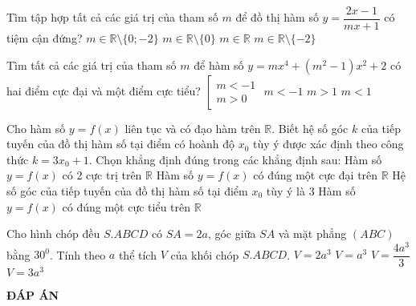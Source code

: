 \begin{ex}%
Tìm tập hợp tất cả các giá trị của tham số $m$ để đồ thị hàm số $y=\dfrac{2x-1}{mx+1}$ có tiệm cận đứng?
\choice
{\True $m\in \mathbb{R}\setminus \lbrace 0;-2\rbrace$}
{$m\in \mathbb{R}\setminus \lbrace 0\rbrace$}
{$m\in \mathbb{R}$}
{$m\in \mathbb{R}\setminus \lbrace -2 \rbrace$}
\end{ex}
\begin{ex}%
Tìm tất cả các giá trị của tham số $m$ để hàm số $y=mx^4+ \left(m^2-1 \right)x^2+2$ có hai điểm cực đại và một điểm cực tiểu?
\choice
{$\left[ \begin{array}{l}
m <  - 1\\
m > 0
\end{array} \right.$}
{\True$m<-1$}
{$m>1$}
{$m<1$}
\end{ex}
\begin{ex}%
Cho hàm số $y=f(x)$ liên tục và có đạo hàm trên $\mathbb{R}$. Biết hệ số góc $k$ của tiếp tuyến của đồ thị hàm số tại điểm có hoành độ $x_0$ tùy ý được xác định theo công thức $k=3x_0+1$. Chọn khẳng định đúng trong các khẳng định sau:
\choice
{Hàm số $y=f(x)$ có 2 cực trị trên $\mathbb{R}$}
{Hàm số $y=f(x)$ có đúng một cực đại trên $\mathbb{R}$}
{Hệ số góc của tiếp tuyến của đồ thị hàm số tại điểm $x_0$ tùy ý là $3$}
{\True Hàm số $y=f(x)$ có đúng một cực tiểu trên $\mathbb{R}$}
\end{ex}
\begin{ex}%
Cho hình chóp đều $S.ABCD$ có $SA=2a$, góc giữa $SA$ và mặt phẳng $(ABC)$ bằng $30^0$. Tính theo $a$ thể tích $V$ của khối chóp $S.ABCD$.
\choice
{\True$V=2a^3$}
{$V=a^3$}
{$V=\dfrac{4a^3}{3}$}
{$V=3a^3$}
\end{ex}
\newpage
\begin{center}
	\textbf{ĐÁP ÁN}
\end{center}
\begin{multicols}{10}
	 
\end{multicols}